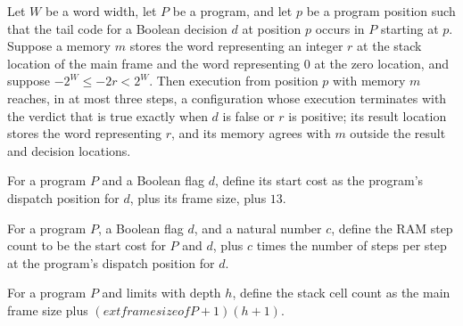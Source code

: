 \begin{theorem}
\label{Light.Compiler.steps_tail}
\leanok
{}
Let $W$ be a word width, let $P$ be a program, and let $p$ be a program position such
that the tail code for a Boolean decision $d$ at position $p$ occurs in $P$ starting at
$p$. Suppose a memory $m$ stores the word representing an integer $r$ at the stack
location of the main frame and the word representing $0$ at the zero location, and
suppose $-2^W \le -2r < 2^W$. Then execution from position $p$ with memory $m$ reaches,
in at most three steps, a configuration whose execution terminates with the verdict that
is true exactly when $d$ is false or $r$ is positive; its result location stores the
word representing $r$, and its memory agrees with $m$ outside the result and decision
locations.
\end{theorem}

\begin{definition}
\label{Light.Compiler.startCost}
\leanok
{}
For a program $P$ and a Boolean flag $d$, define its start cost as the program's
dispatch position for $d$, plus its frame size, plus $13$.
\end{definition}

\begin{definition}
\label{Light.ramSteps}
\leanok
{}
For a program $P$, a Boolean flag $d$, and a natural number $c$, define the RAM step
count to be the start cost for $P$ and $d$, plus $c$ times the number of steps per step
at the program's dispatch position for $d$.
\end{definition}

\begin{definition}
\label{Light.Compiler.stackCells}
\leanok
{}
For a program $P$ and limits with depth $h$, define the stack cell count as the main
frame size plus $(	ext{frame size of }P+1)(h+1)$.
\end{definition}

